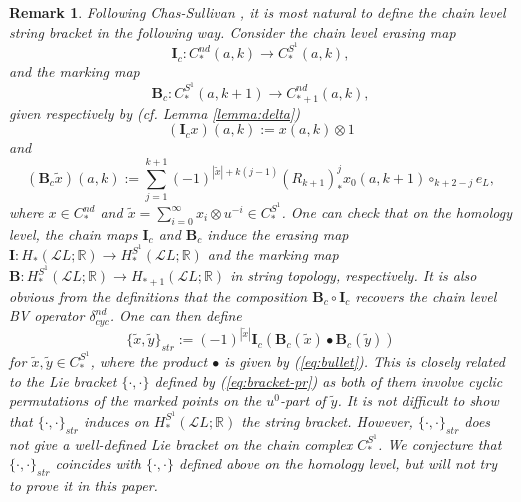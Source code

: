 \documentclass[a4paper]{article}
\newtheorem{remark}[theorem]{Remark}
\numberwithin{equation}{section}
\begin{document}
\begin{remark}\label{remark:str-bra}
Following Chas-Sullivan \cite{cs}, it is most natural to define the chain level string bracket in the following way. Consider the chain level erasing map
\begin{equation}
\mathbf{I}_c:C_\ast^\mathit{nd}(a,k)\rightarrow C_\ast^{S^1}(a,k),
\end{equation}
and the marking map
\begin{equation}
\mathbf{B}_c:C_\ast^{S^1}(a,k+1)\rightarrow C_{\ast+1}^\mathit{nd}(a,k),
\end{equation}
given respectively by (cf. Lemma \ref{lemma:delta})
\begin{equation}
(\mathbf{I}_cx)(a,k):=x(a,k)\otimes1
\end{equation}
and
\begin{equation}\label{eq:mark}
(\mathbf{B}_c\tilde{x})(a,k):=\sum_{j=1}^{k+1}(-1)^{|\tilde{x}|+k(j-1)}(R_{k+1})_\ast^jx_0(a,k+1)\circ_{k+2-j}e_L,
\end{equation}
where $x\in C_\ast^\mathit{nd}$ and $\tilde{x}=\sum_{i=0}^\infty x_i\otimes u^{-i}\in C_\ast^{S^1}$. One can check that on the homology level, the chain maps $\mathbf{I}_c$ and $\mathbf{B}_c$ induce the erasing map $\mathbf{I}:H_\ast(\mathcal{L}L;\mathbb{R})\rightarrow H_\ast^{S^1}(\mathcal{L}L;\mathbb{R})$ and the marking map $\mathbf{B}:H_\ast^{S^1}(\mathcal{L}L;\mathbb{R})\rightarrow H_{\ast+1}(\mathcal{L}L;\mathbb{R})$ in string topology, respectively. It is also obvious from the definitions that the composition $\mathbf{B}_c\circ\mathbf{I}_c$ recovers the chain level BV operator $\delta_\mathit{cyc}^\mathit{nd}$. One can then define
\begin{equation}\label{eq:bracket}
\{\tilde{x},\tilde{y}\}_\mathit{str}:=(-1)^{|\tilde{x}|}\mathbf{I}_c\left(\mathbf{B}_c(\tilde{x})\bullet\mathbf{B}_c(\tilde{y})\right)
\end{equation}
for $\tilde{x},\tilde{y}\in C_\ast^{S^1}$, where the product $\bullet$ is given by (\ref{eq:bullet}). This is closely related to the Lie bracket $\{\cdot,\cdot\}$ defined by (\ref{eq:bracket-pr}) as both of them involve cyclic permutations of the marked points on the $u^0$-part of $\tilde{y}$. It is not difficult to show that $\{\cdot,\cdot\}_\mathit{str}$ induces on $H_\ast^{S^1}(\mathcal{L}L;\mathbb{R})$ the string bracket. However, $\{\cdot,\cdot\}_\mathit{str}$ does not give a well-defined Lie bracket on the chain complex $C_\ast^{S^1}$. We conjecture that $\{\cdot,\cdot\}_\mathit{str}$ coincides with $\{\cdot,\cdot\}$ defined above on the homology level, but will not try to prove it in this paper.
\end{remark}
\end{document}
